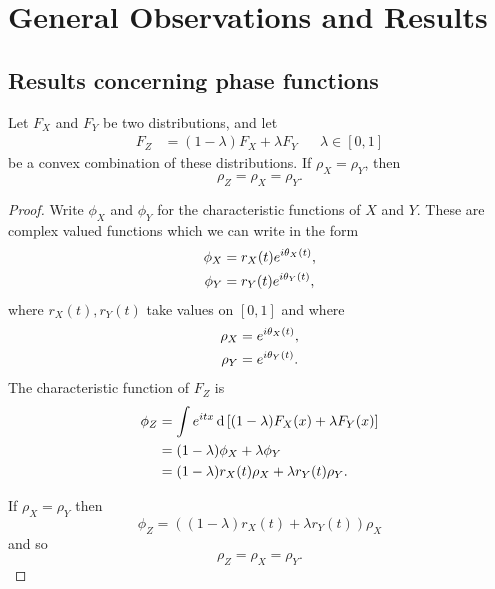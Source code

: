 	

\section{General Observations and Results}
\label{sec:deconvolution observations and results}
	
	\subsection{Results concerning phase functions}
	\begin{theorem}
		Let $F_X$ and $F_Y$ be two distributions, and let
		\begin{align}
			F_Z &= (1 - \lambda) F_X + \lambda F_Y && \lambda \in [0,1]
		\end{align}
		be a convex combination of these distributions. If $\rho_X = \rho_Y$, then 
		\begin{equation}
			\rho_Z = \rho_X = \rho_Y.
		\end{equation}
	\end{theorem}
	\begin{proof}
		Write $\phi_X$ and $\phi_Y$ for the characteristic functions of $X$ and $Y$. These are complex valued functions which we can write in the form
		\begin{align}
			\phi_X &= r_X(t) e^{i\theta_X(t)},\\
			\phi_Y &= r_Y(t) e^{i\theta_Y(t)},
		\end{align}
		where $r_X(t), r_Y(t)$ take values on $[0, 1]$ and where
		\begin{align}
			\rho_X &= e^{i\theta_X(t)},\\
			\rho_Y &= e^{i\theta_Y(t)}.
		\end{align}
		The characteristic function of $F_Z$ is 
		\begin{align}
			\phi_Z &= \int e^{itx} \, \mathrm{d} \left[(1 - \lambda)F_X(x) + \lambda F_Y(x)\right]\\
			&= (1 - \lambda)\phi_X + \lambda \phi_Y\\
			&= (1 - \lambda) r_X(t) \rho_X + \lambda r_Y(t) \rho_Y.
		\end{align}

		If $\rho_X = \rho_Y$ then
		\begin{equation}
			\phi_Z = \left((1 - \lambda)r_X(t) + \lambda r_Y(t)\right) \rho_X
		\end{equation}
		and so 
		\begin{equation}
			\rho_Z = \rho_X = \rho_Y.
		\end{equation}
	\end{proof}


